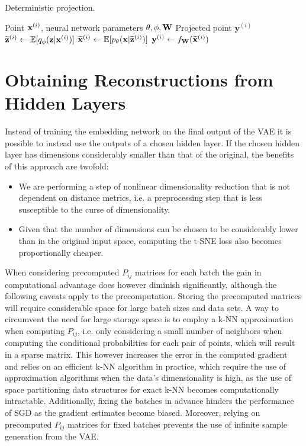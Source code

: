 \begin{algorithm}[H]
  \caption{Deterministic projection.}
  \label{alg:projection}
  \begin{algorithmic}[1]
    \Require Point $\mathbf{x}^{(i)}$, neural network parameters $\theta, \phi, \mathbf{W}$
    \Ensure Projected point $\mathbf{y}^{(i)}$
    \State $\widetilde{\mathbf{z}}^{(i)} \gets \mathbb{E}[q_{\phi}(\mathbf{z} \vert \mathbf{x}^{(i)})]$
    \State $\widetilde{\mathbf{x}}^{(i)} \gets \mathbb{E}[p_{\theta}(\mathbf{x} \vert \widetilde{\mathbf{z}}^{(i)})]$
    \State $\mathbf{y}^{(i)} \gets f_{\mathbf{W}}(\widetilde{\mathbf{x}}^{(i)})$
  \end{algorithmic}
\end{algorithm}

\section{Obtaining Reconstructions from Hidden Layers}
\label{section:sampling_from_hidden_layers}

Instead of training the embedding network on the final output of the VAE it is possible to instead use the outputs of a chosen hidden layer. If the chosen hidden layer has dimensions considerably smaller than that of the original, the benefits of this approach are twofold:

\begin{itemize}
\item We are performing a step of nonlinear dimensionality reduction that is not dependent on distance metrics, i.e. a preprocessing step that is less susceptible to the curse of dimensionality.
\item Given that the number of dimensions can be chosen to be considerably lower than in the original input space, computing the t-SNE loss also becomes proportionally cheaper.
\end{itemize}

When considering precomputed $P_{ij}$ matrices for each batch the gain in computational advantage does however diminish significantly, although the following caveats apply to the precomputation. Storing the precomputed matrices will require considerable space for large batch sizes and data sets. A way to circumvent the need for large storage space is to employ a k-NN approximation when computing $P_{ij}$, i.e. only considering a small number of neighbors when computing the conditional probabilities for each pair of points, which will result in a sparse matrix. This however increases the error in the computed gradient and relies on an efficient k-NN algorithm in practice, which require the use of approximation algorithms when the data's dimensionality is high, as the use of space partitioning data structures for exact k-NN becomes computationally intractable. Additionally, fixing the batches in advance hinders the performance of SGD as the gradient estimates become biased. Moreover, relying on precomputed $P_{ij}$ matrices for fixed batches prevents the use of infinite sample generation from the VAE.

